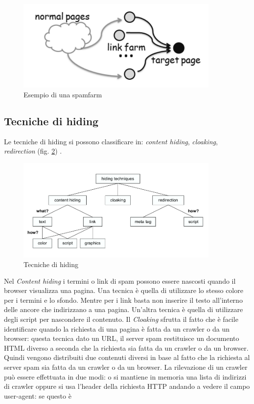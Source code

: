 \begin{figure} 
 \centering
 \includegraphics[width=10cm]{immagini/spamfarm}
 \caption{Esempio di una spamfarm}
 \label{fig:spamfarm}
\end{figure}

\subsection{Tecniche di hiding}
Le tecniche di hiding si possono classificare in: \textit{content hiding}, \textit{cloaking}, \textit{redirection} (fig. \ref{fig:tecnicheHiding}) \cite{ilprints646}.
\begin{figure} 
 \centering
 \includegraphics[width=10cm]{immagini/tassonomiaHiding}
 \caption{Tecniche di hiding}
 \label{fig:tecnicheHiding}
\end{figure}
Nel \textit{Content hiding} i termini o link di spam possono essere nascosti quando il browser visualizza una pagina. Una tecnica è quella di utilizzare lo stesso colore per i termini e lo sfondo. Mentre per i link basta non inserire il testo all'interno delle ancore che indirizzano a una pagina. Un'altra tecnica è quella di utilizzare degli script per nascondere il contenuto. Il \textit{Cloaking} sfrutta il fatto che è facile identificare quando la richiesta di una pagina è fatta da un crawler o da un browser: questa tecnica dato un URL, il server spam restituisce un documento HTML diverso a seconda che la richiesta sia fatta da un crawler o da un browser. Quindi vengono distribuiti due contenuti diversi in base al fatto che la richiesta al server spam sia fatta da un crawler o da un browser. La rilevazione di un crawler può essere effettuata in due modi: o si mantiene in memoria una lista di indirizzi di crawler oppure si usa l'header della richiesta HTTP andando a vedere il campo user-agent: se questo è 
